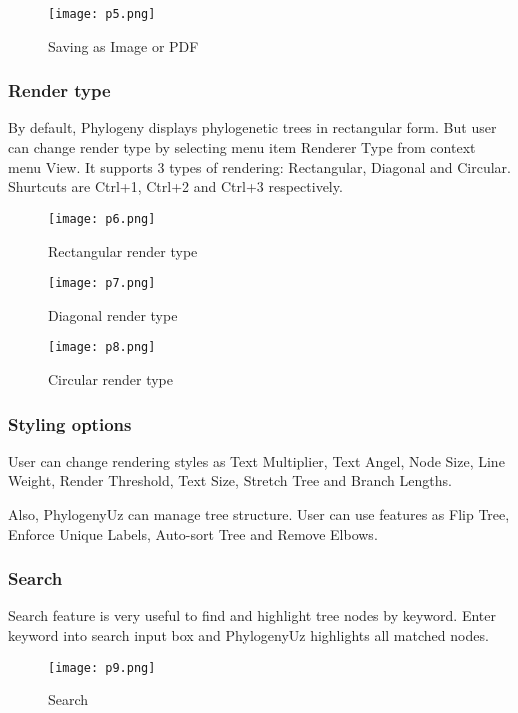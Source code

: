 \begin{figure}[!htbp] 
  \center
  \texttt{[image: p5.png]}
  \caption[w]{Saving as Image or PDF} 
  \label{img:p5}  
\end{figure}

\subsubsection{Render type}
By default, Phylogeny displays phylogenetic trees in 
rectangular form. But user can change render type 
by selecting menu item Renderer Type from context menu View.
It supports 3 types of rendering: Rectangular, Diagonal and Circular.
Shurtcuts are Ctrl+1, Ctrl+2 and Ctrl+3 respectively.

\begin{figure}[!htbp] 
  \center
  \texttt{[image: p6.png]}
  \caption[w]{Rectangular render type} 
  \label{img:p6}  
\end{figure}

\begin{figure}[!htbp] 
  \center
  \texttt{[image: p7.png]}
  \caption[w]{Diagonal render type} 
  \label{img:p7}  
\end{figure}

\begin{figure}[!htbp] 
  \center
  \texttt{[image: p8.png]}
  \caption[w]{Circular render type} 
  \label{img:p8}  
\end{figure}

\subsubsection{Styling options}
User can change rendering styles as Text Multiplier,
Text Angel, Node Size, Line Weight, Render Threshold,
Text Size, Stretch Tree and Branch Lengths.

Also, PhylogenyUz can manage tree structure. 
User can use features as Flip Tree, Enforce Unique Labels, 
Auto-sort Tree and Remove Elbows.

\subsubsection{Search}
Search feature is very useful to find and highlight tree nodes by keyword.
Enter keyword into search input box and PhylogenyUz 
highlights all matched nodes.

\begin{figure}[t] 
  \center
  \texttt{[image: p9.png]}
  \caption[w]{Search} 
  \label{img:p9}  
\end{figure}


